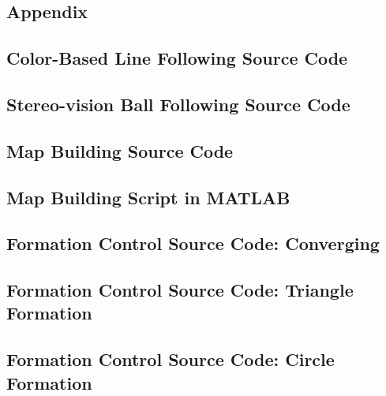 \documentclass[12pt]{article}
\begin{document}
\lstset{breaklines=true}
\begin{footnotesize}


\section{Appendix}

\subsection{Color-Based Line Following Source Code}


\newpage


\subsection{Stereo-vision Ball Following Source Code}


\newpage

\subsection{Map Building Source Code}



\newpage
\subsection{Map Building Script in MATLAB}

\newpage

\subsection{Formation Control Source Code: Converging}


\newpage

\subsection{Formation Control Source Code: Triangle Formation}

\newpage

\subsection{Formation Control Source Code: Circle Formation}


\end{footnotesize}
\end{document}
